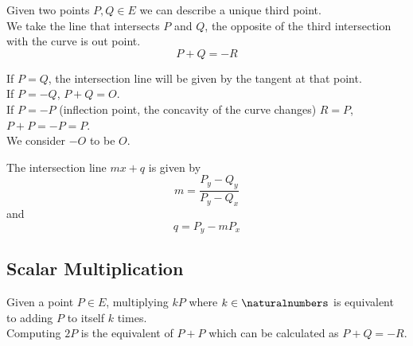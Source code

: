 \documentclass[a4paper]{article}
\begin{document}
Given two points \(P,Q\in E\) we can describe a unique third point.\\
We take the line that intersects \(P\) and \(Q\), the opposite of the third intersection with the curve is out point.
\[
    P+Q=-R
\]

If \(P=Q\), the intersection line will be given by the tangent at that point.\\
If \(P=-Q\), \(P+Q=O\).\\
If \(P=-P\) (inflection point, the concavity of the curve changes) \(R=P\), \(P+P=-P=P\).\\
We consider \(-O\) to be \(O\).

The intersection line \(mx+q\) is given by
\[
    m=\frac{P_y-Q_y}{P_y-Q_x}
\]
and
\[
    q=P_y-mP_x
\]

\begin{center}
\end{center}

\subsection{Scalar Multiplication}

Given a point \(P\in E\), multiplying \(kP\) where \(k\in\naturalnumbers\) is equivalent to adding \(P\) to itself \(k\) times.\\
Computing \(2P\) is the equivalent of \(P+P\) which can be calculated as \(P+Q=-R\).
\end{document}
